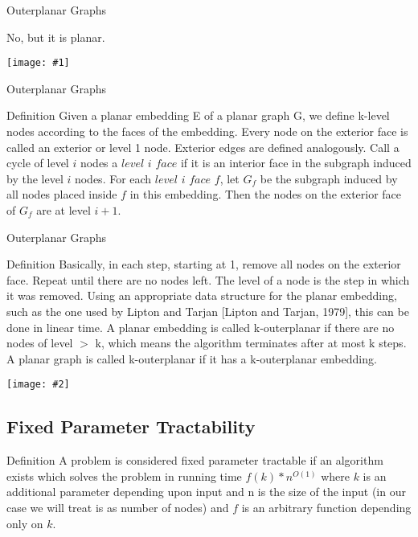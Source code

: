 \documentclass{beamer}
\newcommand{\iph}[2]{
    \texttt{[image: \#2]}
}
\newcommand{\ph}[1]{
    \texttt{[image: \#1]}
}
\begin{document}
\begin{frame}{Outerplanar Graphs}
\begin{example}
    No, but it is planar.

    \ph{o6}


\end{example}
\end{frame}

\begin{frame}{Outerplanar Graphs}
\begin{block}{Definition}
    Given a planar embedding E of a planar graph G, we
    define k-level nodes according to the faces of the embedding. Every node on the exterior face is called an exterior
    or level 1 node. Exterior edges are defined analogously. Call a cycle of
    level $i$ nodes a $level$ $i$ $face$ if it is an interior face in the subgraph induced by
    the level $i$ nodes. For each $level$ $i$ $face$ $f$, let $G_f$ be the subgraph induced by all
    nodes placed inside $f$ in this embedding. Then the nodes on the exterior face
    of $G_f$ are at level $i + 1$. 
\end{block}
\end{frame}


\begin{frame}{Outerplanar Graphs}
\begin{block}{Definition}
    Basically, in each
    step, starting at 1, remove all nodes on the exterior face.
    Repeat until there are no nodes left. The level of a node
    is the step in which it was removed. Using an appropriate data structure for the planar embedding, such as the
    one used by Lipton and Tarjan [Lipton and Tarjan,
    1979], this can be done in linear time.
    A planar embedding is called k-outerplanar if there are
    no nodes of level $>$ k, which means the algorithm terminates after at most k steps. A planar graph is called
    k-outerplanar if it has a k-outerplanar embedding.  
\end{block}
\end{frame}
\begin{frame}
    \begin{example}
        \iph{0.75}{o7}
    \end{example}
\end{frame}
\subsection{Fixed Parameter Tractability}
\begin{frame}
    \begin{block}{Definition}
        A problem is considered fixed parameter tractable if an algorithm exists which solves the problem in running time $f(k) * n^{O(1)}$ where $k$ is an additional parameter depending upon input and n is the size of the input (in our case we will treat is as number of nodes) and $f$ is an arbitrary function depending only on $k$.
    \end{block}

\end{frame}
\end{document}
